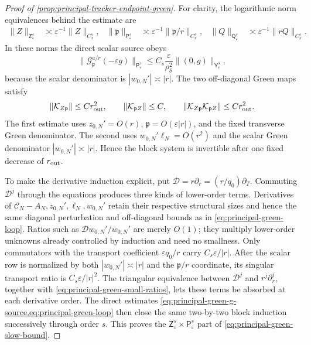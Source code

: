 \begin{proof}[Proof of \cref{prop:principal-tracker-endpoint-green}]
For clarity, the logarithmic norm equivalences behind the estimate are
\begin{align}
 \|Z\|_{\mathsf Z_\varepsilon^s}
 &\asymp\varepsilon^{-1}\|Z\|_{C_x^s},&
 \|\mathfrak p\|_{\mathsf P_\varepsilon^s}
 &\asymp\varepsilon^{-1}\|\mathfrak p/r\|_{C_x^s},&
 \|Q\|_{\mathsf Q_\varepsilon^s}
 &\asymp\varepsilon^{-1}\|rQ\|_{C_x^s}.          \label{eq:principal-green-log-norms}
\end{align}
In these norms the direct scalar source obeys
\begin{equation}
 \|\mathscr G_{\mathfrak p}^{a/r}(-\varepsilon g)\|_{
       \mathsf P_\varepsilon^s}
 \le C_s\frac{\varepsilon}{\rho_\delta^2}
       \|(0,g)\|_{\mathsf Y_\varepsilon^s},       \label{eq:principal-green-g-source}
\end{equation}
because the scalar denominator is \(|w_{0,N}'|\asymp|r|\).  The two
off-diagonal Green maps satisfy
\begin{equation}
 \|\mathcal K_{Z\mathfrak p}\|\le Cr_{\rm out}^2,
 \qquad
 \|\mathcal K_{\mathfrak p Z}\|\le C,
 \qquad
 \|\mathcal K_{Z\mathfrak p}\mathcal K_{\mathfrak p Z}\|
 \le Cr_{\rm out}^2.                               \label{eq:principal-green-loop}
\end{equation}
The first estimate uses \(z_{0,N}'=O(r)\),
\(\mathfrak p=O(\varepsilon|r|)\), and the fixed transverse Green
denominator.  The second uses
\(w_{0,N}'\ell_N=O(r^2)\) and the scalar Green denominator
\(|w_{0,N}'|\asymp|r|\).  Hence the block system is invertible after one
fixed decrease of \(r_{\rm out}\).

To make the derivative induction explicit, put
\(\mathcal D=r\partial_r=(r/q_0)\partial_T\).  Commuting
\(\mathcal D^j\) through the equations produces three kinds of lower-order
terms.  Derivatives of
\(\mathcal C_N-A_N,z_{0,N}',\ell_N,w_{0,N}'\) retain their respective structural
sizes and hence the same diagonal perturbation and off-diagonal bounds as in
\cref{eq:principal-green-loop}.  Ratios such as
\(\mathcal Dw_{0,N}'/w_{0,N}'\) are merely \(O(1)\); they multiply
lower-order unknowns already controlled by induction and need no smallness.
Only commutators with the transport coefficient
\(\varepsilon q_0/r\) carry \(C_s\varepsilon/|r|\).  After the scalar row
is normalized by both \(|w_{0,N}'|\asymp|r|\) and the
\(\mathfrak p/r\) coordinate, its singular transport ratio is
\(C_s\varepsilon/|r|^2\).  The triangular equivalence between
\(\mathcal D^j\) and \(r^j\partial_r^j\), together with
\cref{eq:principal-green-small-ratios}, lets these terms be absorbed at
each derivative order.  The direct estimates
\cref{eq:principal-green-g-source,eq:principal-green-loop} then close the
same two-by-two block induction successively through order \(s\).  This proves the
\(\mathsf Z_\varepsilon^s\times\mathsf P_\varepsilon^s\) part of
\cref{eq:principal-green-slow-bound}.


\end{proof}
